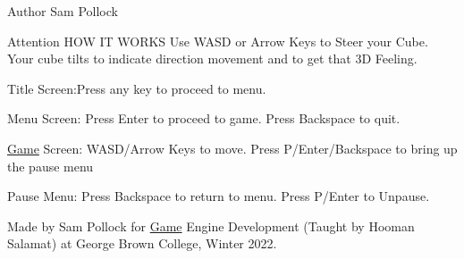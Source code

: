 \begin{DoxyAuthor}{Author}
Sam Pollock
\end{DoxyAuthor}
\begin{DoxyAttention}{Attention}
HOW IT WORKS Use WASD or Arrow Keys to Steer your Cube. Your cube tilts to indicate direction movement and to get that 3D Feeling.
\end{DoxyAttention}
Title Screen\+:Press any key to proceed to menu.

Menu Screen\+: Press Enter to proceed to game. Press Backspace to quit.

\mbox{\hyperlink{class_game}{Game}} Screen\+: WASD/\+Arrow Keys to move. Press \textquotesingle{}P\textquotesingle{}/\+Enter/\+Backspace to bring up the pause menu

Pause Menu\+: Press Backspace to return to menu. Press \textquotesingle{}P\textquotesingle{}/\+Enter to Unpause.

Made by Sam Pollock for \mbox{\hyperlink{class_game}{Game}} Engine Development (Taught by Hooman Salamat) at George Brown College, Winter 2022. 
